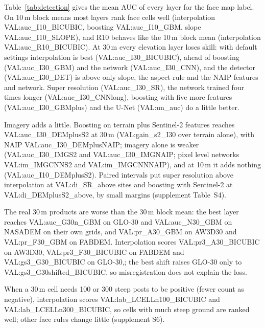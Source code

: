 Table~\ref{tab:detection} gives the mean AUC of every layer for the face map label. On 10\,m block means most layers rank face cells well (interpolation {{VAL:auc_I10_BICUBIC}}, boosting {{VAL:auc_I10_GBM}}, slope {{VAL:auc_I10_SLOPE}}), and R10 behaves like the 10\,m block mean (interpolation {{VAL:auc_R10_BICUBIC}}). At 30\,m every elevation layer loses skill: with default settings interpolation is best ({{VAL:auc_I30_BICUBIC}}), ahead of boosting ({{VAL:auc_I30_GBM}}) and the network ({{VAL:auc_I30_CNN}}), and the detector ({{VAL:auc_I30_DET}}) is above only slope, the aspect rule and the NAIP features and network. Super resolution ({{VAL:auc_I30_SR}}), the network trained four times longer ({{VAL:auc_I30_CNNlong}}), boosting with five more features ({{VAL:auc_I30_GBMplus}}) and the U-Net ({{VAL:un_auc}}) do a little better.

Imagery adds a little. Boosting on terrain plus Sentinel-2 features reaches {{VAL:auc_I30_DEMplusS2}} at 30\,m ({{VAL:gain_s2_I30}} over terrain alone), with NAIP {{VAL:auc_I30_DEMplusNAIP}}; imagery alone is weaker ({{VAL:auc_I30_IMGS2}} and {{VAL:auc_I30_IMGNAIP}}; pixel level networks {{VAL:im_IMGCNNS2}} and {{VAL:im_IMGCNNNAIP}}), and at 10\,m it adds nothing ({{VAL:auc_I10_DEMplusS2}}). Paired intervals put super resolution above interpolation at {{VAL:di_SR_above}} sites and boosting with Sentinel-2 at {{VAL:di_DEMplusS2_above}}, by small margins (supplement Table~S4).

The real 30\,m products are worse than the 30\,m block mean: the best layer reaches {{VAL:auc_G30n_GBM}} on GLO-30 and {{VAL:auc_N30_GBM}} on NASADEM on their own grids, and {{VAL:pr_A30_GBM}} on AW3D30 and {{VAL:pr_F30_GBM}} on FABDEM. Interpolation scores {{VAL:pr3_A30_BICUBIC}} on AW3D30, {{VAL:pr3_F30_BICUBIC}} on FABDEM and {{VAL:gs3_G30_BICUBIC}} on GLO-30,; the best shift raises GLO-30 only to {{VAL:gs3_G30shifted_BICUBIC}}, so misregistration does not explain the loss.

When a 30\,m cell needs 100 or 300 steep posts to be positive (fewer count as negative), interpolation scores {{VAL:lab_LCELLn100_BICUBIC}} and {{VAL:lab_LCELLn300_BICUBIC}}, so cells with much steep ground are ranked well; other face rules change little (supplement S6).
